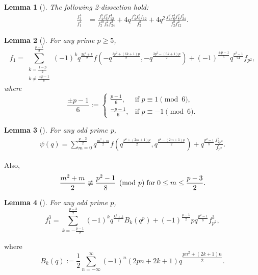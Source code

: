 \documentclass[11pt, reqno]{amsart}
\newtheorem{lma}{Lemma}[section]
\numberwithin{equation}{section}
\begin{document}
	\begin{lma} [{\cite{xia2013analogues}}] The following 2-dissection hold:
		\begin{align}      
			\frac{f_3^4}{f_1^4}
			&=\frac{f_4^8 f_6^2 f_{12}^{4}}{f_2^{10} f_8^2 f_{24}^{2}}
			+ 4q \frac{f_4^5 f_6^3 f_{12}}{f_2^9}
			+ 4q^2 \frac{f_4^2 f_6^4 f_8^2 f_{24}^{2}}{f_2^8 f_{12}^{2}}.\label{f34f14}
		\end{align}
	\end{lma}
	\begin{lma}[{\cite[Theorem ~2.2]{cui2013}}]\label{a1}
		For any prime $p\ge5$,
		\begin{equation}\label{a17}
			f_1=\sum\limits_{\substack{k=\frac{1-p}{2}\\k\neq\frac{\pm p-1}{6}
			}}^{\frac{p-1}{2}}{(-1)^kq^{\frac{3k^2+k}{2}}f\left(-q^{\frac{3p^2+(6k+1)p}{2}},-q^{\frac{3p^2-(6k+1)p}{2}}\right)}+(-1)^{\frac{\pm p-1}{6}}q^{\frac{p^2-1}{24}}f_{p^2},
		\end{equation}
		where
		\begin{equation}
			\dfrac{\pm p-1}{6}:=\begin{cases}
				\frac{p-1}{6}, & \text{if $p \equiv 1 \pmod{6}$},\\
				\frac{-p-1}{6}, & \text{if $p \equiv -1 \pmod{6}$}.\nonumber
			\end{cases}
		\end{equation}
	\end{lma}
	
	\begin{lma}[{\cite[Theorem ~2.1]{cui2013}}]
		For any odd prime p,
		\begin{align}
			\psi(q)=\sum_{m=0}^{\frac{p-3}{2}}q^{\frac{m^{2}+m}{2}}f\left ( q^\frac{p^2+(2m+1)p}{2},q^\frac{p^2-(2m+1)p}{2} \right )+q^{\frac{p^{2}-1}{8}}\frac{f_{2p^{2}}^{2}}{f_{p^{2}}}.\label{a2}
		\end{align}
	\end{lma}
	Also,
	\begin{equation*}
		\frac{m^{2}+m}{2}\not \equiv \frac{p^{2}-1}{8} \pmod{p} {\hspace{1mm}} \text{for} {\hspace{1mm}} 0\leq m\leq \frac{p-3}{2}.
	\end{equation*}
	
	\begin{lma}[{\cite[Theorem 2.1]{LW}}]
		For any odd prime $p$,
		\begin{equation}
			f_{1}^{3}=\sum_{k=-\frac{p-1}{2}}^{\frac{p-3}{2}}(-1)^kq^{\frac{k^{2}+k}{2}}B_k(q^p)+(-1)^{\frac{p-1}{2}}pq^{\frac{p^{2}-1}{8}}f_{p^{2}}^{3},\label{abc1}
		\end{equation}
	\end{lma}
	where $$B_k(q):=\frac{1}{2}\sum_{n=-\infty}^{\infty}(-1)^n(2pn+2k+1)q^{\dfrac{pn^2+(2k+1)n}{2}}.$$
	
\end{document}

